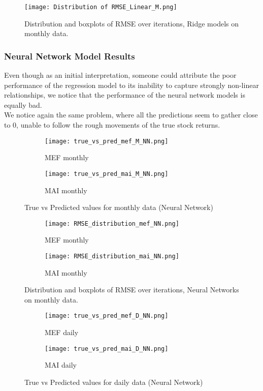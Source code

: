 \documentclass{article}
\begin{document}
\begin{figure}[H]
    \centering \texttt{[image: Distribution of RMSE\_Linear\_M.png]}
    \caption{Distribution and boxplots of RMSE over iterations, Ridge models on monthly data.}
\end{figure}

\subsubsection{Neural Network Model Results}
Even though as an initial interpretation, someone could attribute the poor performance of the regression model to its inability to capture strongly non-linear relationships, we notice that the performance of the neural network models is equally bad.
\\
We notice again the same problem, where all the predictions seem to gather close to 0, unable to follow the rough movements of the true stock returns.

\begin{figure}[H]
  \centering
  \begin{subfigure}{0.45\linewidth}
    \texttt{[image: true\_vs\_pred\_mef\_M\_NN.png]}
    \caption{MEF monthly}
  \end{subfigure}
  \hfill
  \begin{subfigure}{0.45\linewidth}
    \texttt{[image: true\_vs\_pred\_mai\_M\_NN.png]}
    \caption{MAI monthly}
  \end{subfigure}
  \caption{True vs Predicted values for monthly data (Neural Network)}

  \end{figure}

  \begin{figure}[H]
  \centering
  \begin{subfigure}{0.45\linewidth}
    \texttt{[image: RMSE\_distribution\_mef\_NN.png]}
    \caption{MEF monthly}
  \end{subfigure}
  \hfill
  \begin{subfigure}{0.45\linewidth}
    \texttt{[image: RMSE\_distribution\_mai\_NN.png]}
    \caption{MAI monthly}
  \end{subfigure}
  \caption{Distribution and boxplots of RMSE over iterations, Neural Networks on monthly data.}

  \end{figure}

  \begin{figure}[H]
  \centering
  \begin{subfigure}{0.45\linewidth}
    \texttt{[image: true\_vs\_pred\_mef\_D\_NN.png]}
    \caption{MEF daily}
  \end{subfigure}
  \hfill
  \begin{subfigure}{0.45\linewidth}
    \texttt{[image: true\_vs\_pred\_mai\_D\_NN.png]}
    \caption{MAI daily}
  \end{subfigure}
  \caption{True vs Predicted values for daily data (Neural Network)}

  \end{figure}
\end{document}
